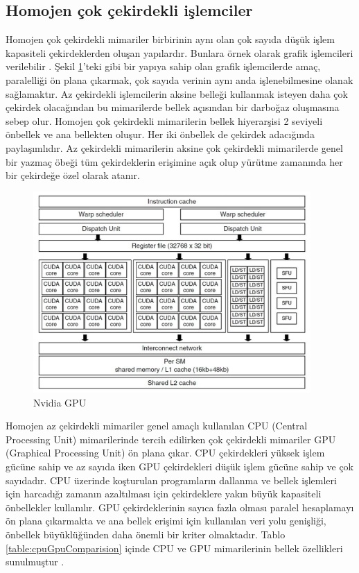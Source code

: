 \subsection{Homojen çok çekirdekli işlemciler}
Homojen çok çekirdekli mimariler birbirinin aynı olan çok sayıda düşük işlem kapasiteli çekirdeklerden oluşan yapılardır. Bunlara örnek olarak grafik işlemcileri verilebilir \cite{MCSE.2012.23}. Şekil \ref{image:nvidiagpu}'teki gibi bir yapıya sahip olan grafik işlemcilerde amaç, paralelliği ön plana çıkarmak, çok sayıda verinin aynı anda işlenebilmesine olanak sağlamaktır. Az çekirdekli işlemcilerin aksine belleği kullanmak isteyen daha çok çekirdek olacağından bu mimarilerde bellek açısından bir darboğaz oluşmasına sebep olur. Homojen çok çekirdekli mimarilerin bellek hiyerarşisi 2 seviyeli önbellek ve ana bellekten oluşur. Her iki önbellek de çekirdek adacığında paylaşımlıdır. Az çekirdekli mimarilerin aksine çok çekirdekli mimarilerde genel bir yazmaç öbeği tüm çekirdeklerin erişimine açık olup yürütme zamanında her bir çekirdeğe özel olarak atanır.

\begin{figure}[h] \label{image:nvidiagpu} 
\centering \includegraphics[width=300pt]{gorsel/nvidiagpu.jpg} \caption{Nvidia GPU}  
\end{figure}

Homojen az çekirdekli mimariler genel amaçlı kullanılan CPU (Central Processing Unit) mimarilerinde tercih edilirken çok çekirdekli mimariler GPU (Graphical Processing Unit) ön plana çıkar. CPU çekirdekleri yüksek işlem gücüne sahip ve az sayıda iken GPU çekirdekleri düşük işlem gücüne sahip ve çok sayıdadır. CPU üzerinde koşturulan programların dallanma ve bellek işlemleri için harcadığı zamanın azaltılması için çekirdeklere yakın büyük kapasiteli önbellekler kullanılır. GPU çekirdeklerinin sayıca fazla olması paralel hesaplamayı ön plana çıkarmakta ve ana bellek erişimi için kullanılan veri yolu genişliği, önbellek büyüklüğünden daha önemli bir kriter olmaktadır. Tablo \ref{table:cpuGpuComparision} içinde CPU ve GPU mimarilerinin bellek özellikleri sunulmuştur \cite{cpuGpuMemoryTable}. \par

